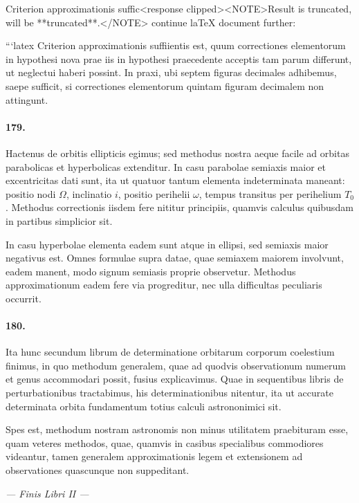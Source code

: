 \documentclass[12pt,a4paper]{article}
\begin{document}
Criterion approximationis suffic<response clipped><NOTE>Result is truncated, will be **truncated**.</NOTE> continue laTeX document further:

```latex
Criterion approximationis suffiientis est, quum correctiones elementorum in hypothesi nova prae iis in hypothesi praecedente acceptis tam parum differunt, ut neglectui haberi possint. In praxi, ubi septem figuras decimales adhibemus, saepe sufficit, si correctiones elementorum quintam figuram decimalem non attingunt.

\paragraph{179.}
Hactenus de orbitis ellipticis egimus; sed methodus nostra aeque facile ad orbitas parabolicas et hyperbolicas extenditur. In casu parabolae semiaxis maior et excentricitas dati sunt, ita ut quatuor tantum elementa indeterminata maneant: positio nodi $\Omega$, inclinatio $i$, positio perihelii $\omega$, tempus transitus per perihelium $T_0$. Methodus correctionis iisdem fere nititur principiis, quamvis calculus quibusdam in partibus simplicior sit.

In casu hyperbolae elementa eadem sunt atque in ellipsi, sed semiaxis maior negativus est. Omnes formulae supra datae, quae semiaxem maiorem involvunt, eadem manent, modo signum semiasis proprie observetur. Methodus approximationum eadem fere via progreditur, nec ulla difficultas peculiaris occurrit.

\paragraph{180.}
Ita hunc secundum librum de determinatione orbitarum corporum coelestium finimus, in quo methodum generalem, quae ad quodvis observationum numerum et genus accommodari possit, fusius explicavimus. Quae in sequentibus libris de perturbationibus tractabimus, his determinationibus nitentur, ita ut accurate determinata orbita fundamentum totius calculi astrononimici sit.

Spes est, methodum nostram astronomis non minus utilitatem praebituram esse, quam veteres methodos, quae, quamvis in casibus specialibus commodiores videantur, tamen generalem approximationis legem et extensionem ad observationes quascunque non suppeditant.

\vspace{2cm}

\begin{flushright}
\textit{--- Finis Libri II ---}
\end{flushright}
\end{document}
